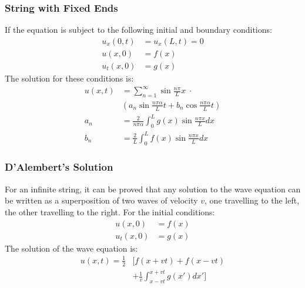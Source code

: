\documentclass[11pt, letterpaper]{article}
\begin{document}
\begin{multicols*}{3}
\subsubsection{String with Fixed Ends}
If the equation is subject to the following initial and boundary conditions:
\begin{align*}
  u_x(0, t) &= u_x(L, t) = 0 \\
  u(x, 0) &= f(x) \\
  u_t(x, 0) &= g(x)
\end{align*}
The solution for these conditions is:
\begin{align*}
  u(x, t) &= \sum_{n=1}^{\infty}\sin{\frac{n\pi}{L} x} \; \cdot \\
  &\left( a_n\sin{\frac{n \pi \alpha}{L} t}
    + b_n\cos{\frac{n \pi \alpha}{L} t} \right) \\
  a_n &= \frac{2}{n \pi \alpha}\int_0^L g(x)\sin\frac{n \pi x}{L} dx \\
  b_n &= \frac{2}{L}\int_0^L f(x)\sin\frac{n \pi x}{L} dx
\end{align*}
\subsubsection{D'Alembert's Solution}
For an infinite string, it can be proved that any solution to the wave equation
can be written as a superposition of two waves of velocity $v$, one travelling
to the left, the other travelling to the right. For the initial conditions:
\begin{align*}
  u(x, 0) &= f(x) \\
  u_t(x, 0) &= g(x)
\end{align*}
The solution of the wave equation is:
\begin{align*}
  u(x, t) = \frac{1}{2} &\bigg[ f(x+vt) + f(x-vt)  \\
  &+ \frac{1}{v}\int_{x-vt}^{x+vt}g(x') dx' \bigg]
\end{align*}

\end{multicols*}
\end{document}
